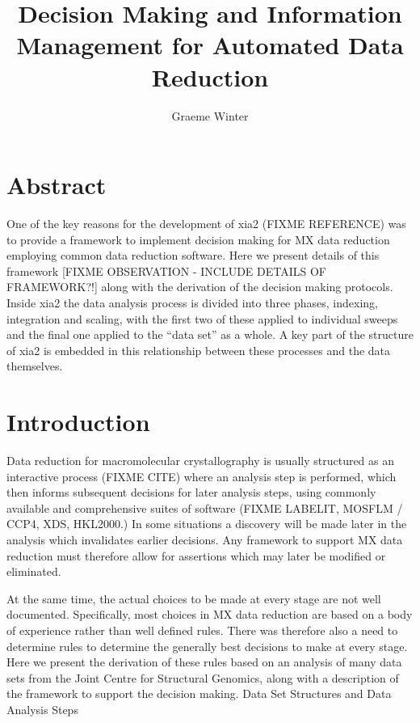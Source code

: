 \documentclass[a4paper, 11pt]{article}
\title{Decision Making and Information Management for Automated Data Reduction}
\author{Graeme Winter}
\begin{document}
\maketitle

\section{Abstract}

One of the key reasons for the development of xia2 (FIXME REFERENCE) was to provide a framework to implement decision making for MX data reduction employing common data reduction software. Here we present details of this framework [FIXME OBSERVATION - INCLUDE DETAILS OF FRAMEWORK?!] along with the derivation of the decision making protocols. Inside xia2 the data analysis process is divided into three phases, indexing, integration and scaling, with the first two of these applied to individual sweeps and the final one applied to the ``data set'' as a whole. A key part of the structure of xia2 is embedded in this relationship between these processes and the data themselves.

\section{Introduction}

Data reduction for macromolecular crystallography is usually structured as an interactive process (FIXME CITE) where an analysis step is performed, which then informs subsequent decisions for later analysis steps, using commonly available and comprehensive suites of software (FIXME LABELIT, MOSFLM / CCP4, XDS, HKL2000.) In some situations a discovery will be made later in the analysis which invalidates earlier decisions. Any framework to support MX data reduction must therefore allow for assertions which may later be modified or eliminated. 

At the same time, the actual choices to be made at every stage are not well documented. Specifically, most choices in MX data reduction are based on a body of experience rather than well defined rules. There was therefore also a need to determine rules to determine the generally best decisions to make at every stage. Here we present the derivation of these rules based on an analysis of many data sets from the Joint Centre for Structural Genomics, along with a description of the framework to support the decision making.
Data Set Structures and Data Analysis Steps
\end{document}
